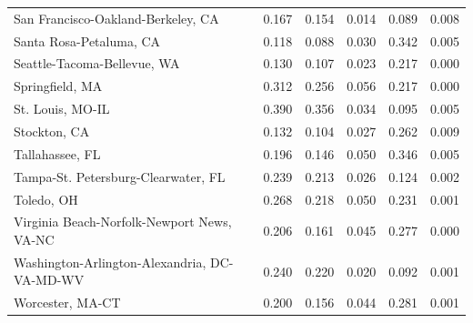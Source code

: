 \documentclass[
  10pt,
]{article}
\begin{document}
\begin{longtable}{lrrrrr}
          San Francisco-Oakland-Berkeley, CA &              0.167 &              0.154 &                 0.014 &           0.089 &       0.008 \\
                     Santa Rosa-Petaluma, CA &              0.118 &              0.088 &                 0.030 &           0.342 &       0.005 \\
                 Seattle-Tacoma-Bellevue, WA &              0.130 &              0.107 &                 0.023 &           0.217 &       0.000 \\
                             Springfield, MA &              0.312 &              0.256 &                 0.056 &           0.217 &       0.000 \\
                            St. Louis, MO-IL &              0.390 &              0.356 &                 0.034 &           0.095 &       0.005 \\
                                Stockton, CA &              0.132 &              0.104 &                 0.027 &           0.262 &       0.009 \\
                             Tallahassee, FL &              0.196 &              0.146 &                 0.050 &           0.346 &       0.005 \\
         Tampa-St. Petersburg-Clearwater, FL &              0.239 &              0.213 &                 0.026 &           0.124 &       0.002 \\
                                  Toledo, OH &              0.268 &              0.218 &                 0.050 &           0.231 &       0.001 \\
  Virginia Beach-Norfolk-Newport News, VA-NC &              0.206 &              0.161 &                 0.045 &           0.277 &       0.000 \\
Washington-Arlington-Alexandria, DC-VA-MD-WV &              0.240 &              0.220 &                 0.020 &           0.092 &       0.001 \\
                            Worcester, MA-CT &              0.200 &              0.156 &                 0.044 &           0.281 &       0.001 \\
\end{longtable}
\end{document}
